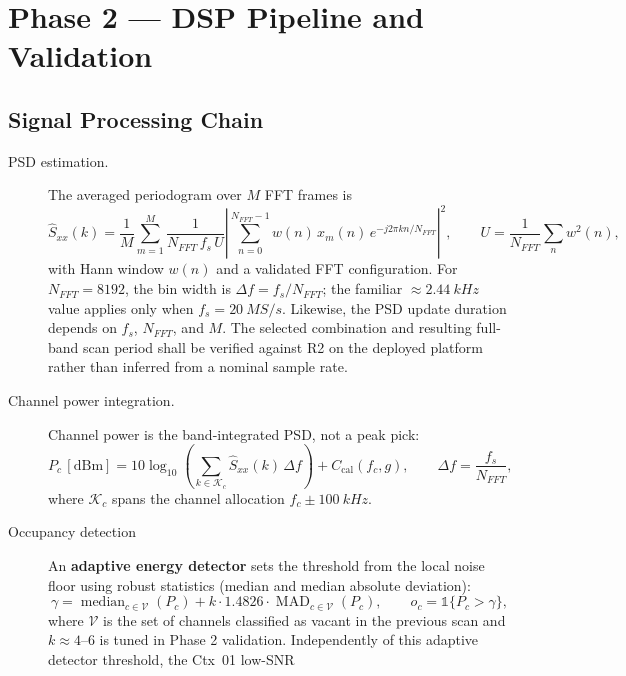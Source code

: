 \documentclass[12pt,a4paper]{report}
\newcommand{\dBm}{\ensuremath{\mathrm{dBm}}}
\begin{document}
 \section{Phase 2 --- DSP Pipeline and Validation}
 \subsection*{Signal Processing Chain}
 \begin{description}
 	\item[PSD estimation.] The averaged periodogram over $M$ FFT frames is
 	\begin{equation}
 		\widehat{S}_{xx}(k) = \frac{1}{M}\sum_{m=1}^{M}
 		\frac{1}{N_{FFT}\,f_s\,U} \left| \sum_{n=0}^{N_{FFT}-1}
 		w(n)\,x_m(n)\,e^{-j2\pi kn/N_{FFT}} \right|^2,
 		\qquad
 		U = \frac{1}{N_{FFT}}\sum_{n} w^2(n),
 	\end{equation}
 	with Hann window $w(n)$ and a validated FFT configuration. For $N_{FFT}=8192$, the bin width is $\Delta f=f_s/N_{FFT}$; the familiar $\approx \SI{2.44}{kHz}$ value applies only when $f_s=\SI{20}{MS/s}$. Likewise, the PSD update duration depends on $f_s$, $N_{FFT}$, and $M$. The selected combination and resulting full-band scan period shall be verified against R2 on the deployed platform rather than inferred from a nominal sample rate.
 	\item[Channel power integration.] Channel power is the band-integrated PSD, not a peak pick:
 	\begin{equation}
 		P_c\,[\dBm] = 10\log_{10}\!\left( \sum_{k \in \mathcal{K}_c}
 		\widehat{S}_{xx}(k)\,\Delta f \right) + C_{\text{cal}}(f_c,g),
 		\qquad \Delta f = \frac{f_s}{N_{FFT}},
 	\end{equation}
 	where $\mathcal{K}_c$ spans the channel allocation $f_c \pm \SI{100}{kHz}$.
 	\item[Occupancy detection] 	An \textbf{adaptive energy detector} sets the threshold from the local noise
 	floor using robust statistics (median and median absolute deviation):
 	\begin{equation}
 		\gamma = \operatorname{median}_{c \in \mathcal{V}}(P_c)
 		+ k \cdot 1.4826 \cdot \operatorname{MAD}_{c \in \mathcal{V}}(P_c),
 		\qquad o_c = \mathbb{1}\{P_c > \gamma\},
 	\end{equation}
 	where $\mathcal{V}$ is the set of channels classified as vacant in the
 	previous scan and $k \approx 4$--$6$ is tuned in Phase 2 validation.
 	Independently of this adaptive detector threshold, the Ctx~01 low-SNR

\end{description}
\end{document}
